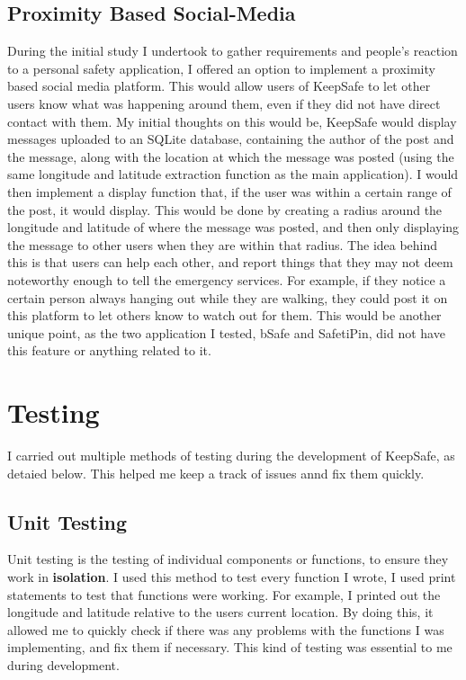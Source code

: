 \documentclass[a4paper]{report}
\begin{document}
\section{Proximity Based Social-Media}
\label{sec:ProxSocialMedia}
During the initial study I undertook to gather requirements and people's reaction to a personal safety application, I offered an option to implement a proximity based social media platform. This would allow users of KeepSafe to let other users know what was happening around them, even if they did not have direct contact with them. My initial thoughts on this would be, KeepSafe would display messages uploaded to an SQLite database, containing the author of the post and the message, along with the location at which the message was posted (using the same longitude and latitude extraction function as the main application). I would then implement a display function that, if the user was within a certain range of the post, it would display. This would be done by creating a radius around the longitude and latitude of where the message was posted, and then only displaying the message to other users when they are within that radius. The idea behind this is that users can help each other, and report things that they may not deem noteworthy enough to tell the emergency services. For example, if they notice a certain person always hanging out while they are walking, they could post it on this platform to let others know to watch out for them. This would be another unique point, as the two application I tested, bSafe and SafetiPin, did not have this feature or anything related to it. 
\chapter{Testing} 
\label{sec:Testing} 
I carried out multiple methods of testing during the development of KeepSafe, as detaied below. This helped me keep a track of issues annd fix them quickly.
\section{Unit Testing} 
Unit testing is the testing of individual components or functions, to ensure they work in \textbf{isolation}. I used this method to test every function I wrote, I used print statements to test that functions were working. For example, I printed out the longitude and latitude relative to the users current location. By doing this, it allowed me to quickly check if there was any problems with the functions I was implementing, and fix them if necessary. This kind of testing was essential to me during development. 
\end{document}
